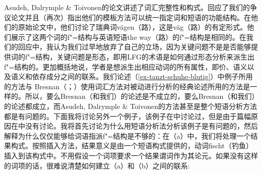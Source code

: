 Asudeh, Dalrymple \& Toivonen的论文讲述了词汇完整性和构式。\citet{AT2014a}回应了我们的争议论文并且（再次）指出他们的模板方法可以统一指定词和短语的功能结构。在他们的原始论文中，他们讨论了瑞典词vägen（路），这是väg（路）的有定形式。他们展示了这两个词的f"=结构与英语短语the way（路）的f"=结构是相同的。在我们的回应\citeyearpar{MWArgStReply}中，我认为我们过早地放弃了自己的立场，因为关键问题不是是否能够提供词的f"=结构，关键问题是形态，即用LFG的术语是如何通过形态分析来派生出f"=结构的。更加概括地说，学者是想派生出相应动词的所有属性，即价、语义以及语义和依存成分之间的联系。我们论述（\ref{ex-tanzt-schuhe-blutig}）中例子所用的方法与 Bresnan（\citeyear[]{Bresnan82a}；\citeyear[]{Bresnan2001a}）使用词汇方法对被动进行分析的经典论述所用的方法是一样的。所以，要么Bresnan（和我们）的论述是不成立的，要么Bresnan（和我们）的论述都成立，而Asudeh, Dalrymple \& Toivonen的方法甚至是整个短语分析方法都是有问题的。下面我将讨论另外一个例子，该例子在中讨论过，但是由于篇幅原因在中没有讨论。我将首先讨论为什么用短语分析法分析该例子是有问题的，然后解释为什么仅仅能够给词语指派f"=结构是不够的：在（a）中，我们将处理一个结果构式。按照插入方法，结果意义是由一个短语构式提供的，动词fischt（钓鱼）插入到该构式中。不用假设一个词项要求一个结果谓词作为其论元。如果没有这样的词项的话，很难说清楚如何建立（a）和（b）之间的联系:
